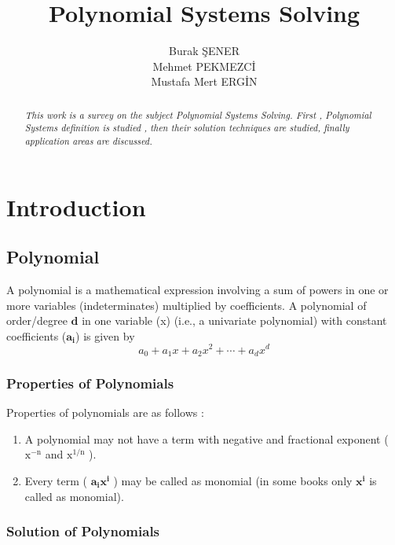 \documentclass[11pt]{article}
\title{\textbf{Polynomial Systems Solving}}
\author{Burak ŞENER\\
        Mehmet PEKMEZCİ\\
		Mustafa Mert ERGİN
		}
\date{}
\begin{document}
\maketitle
\begin{abstract}
\emph{This work is a survey on the subject Polynomial Systems Solving. First , Polynomial Systems definition is studied , then their solution techniques are studied, finally application areas are discussed. }
\end{abstract}

\section{Introduction}

\subsection{Polynomial}
 A polynomial is a mathematical expression involving a sum of powers in one or more variables (indeterminates) multiplied by coefficients. A polynomial of order/degree $\mathbf{d}$  in one variable (x)  (i.e., a univariate polynomial) with constant coefficients ($\mathbf{a_i}$) is given by \cite{wolframPolynomial}
\begin{equation} 
    a_{0}+a_{1}x+a_{2}{x}^2+\cdots+a_{d}{x}^d 
\end{equation}

\subsubsection{Properties of Polynomials}

Properties of polynomials are as follows :
\begin{enumerate}
\item A polynomial may not have a term with negative and fractional exponent ($\mathrm{x^{-n}}$ and $\mathrm{x^{1/n}}$ ).
\item Every term ( $\mathbf{a_ix^i}$ ) may be called as monomial (in some books only $\mathbf{x^i}$ is called as monomial). 
\end{enumerate}

\subsubsection{Solution of Polynomials}
\end{document}
